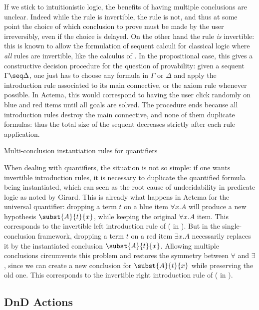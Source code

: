 If we stick to intuitionistic logic, the benefits of having multiple conclusions
are unclear. Indeed while the {} rule is invertible, the
{} rule is not, and thus at some point the choice of which
conclusion to prove must be made by the user irreversibly, even if the choice is
delayed. On the other hand the {} rule \emph{is} invertible:
this is known to allow the formulation of sequent calculi for classical logic
where \emph{all} rules are invertible, like the  calculus of
. In the propositional case, this gives a
constructive decision procedure for the question of provability: given a sequent
$\Gamma \seq \Delta$, one just has to choose any formula in $\Gamma$ or $\Delta$
and apply the introduction rule associated to its main connective, or the axiom
rule whenever possible. In Actema, this would correspond to having the user
click randomly on blue and red items until all goals are solved. The procedure
ends because all introduction rules destroy the main connective, and none of
them duplicate formulas: thus the total size of the sequent decreases strictly
after each rule application.

\begin{marginfigure}
  \caption{Multi-conclusion instantiation rules for quantifiers}
\end{marginfigure}

When dealing with quantifiers, the situation is not so simple: if one wants
invertible introduction rules, it is necessary to duplicate the quantified
formula being instantiated, which can seen as the root cause of undecidability
in predicate logic as noted by Girard. This is already what happens in Actema for the
universal quantifier: dropping a term $t$ on a blue item $\forall x. A$ will
produce a new hypothesis $\subst{A}{t}{x}$, while keeping the original $\forall
x. A$ item. This corresponds to the invertible left introduction rule of
 ({} in ). But in the
single-conclusion framework, dropping a term $t$ on a red item $\exists x. A$
necessarily replaces it by the instantiated conclusion $\subst{A}{t}{x}$.
Allowing multiple conclusions circumvents this problem and restores the symmetry
between $\forall$ and $\exists$, since we can create a new conclusion for
$\subst{A}{t}{x}$ while preserving the old one. This corresponds to the
invertible right introduction rule of  ({} in
).


\subsection{DnD Actions}

